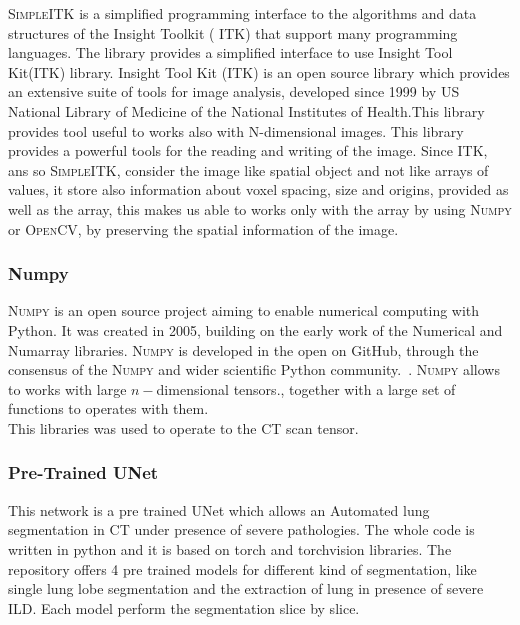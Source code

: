 \documentclass{standalone}
\begin{document}
	\textsc{SimpleITK} is a simplified programming interface to the algorithms and data structures of the Insight Toolkit ( \textsc{ITK}) that support many programming languages. The library provides a simplified interface to use Insight Tool Kit(ITK) library. 
	Insight Tool Kit (ITK) is an open source library which provides an extensive suite of tools for image analysis, developed since 1999 by US National Library of Medicine of the National Institutes of Health.This library provides tool useful to works also with N-dimensional images. 
	This library provides a powerful tools for the reading and writing of the image. Since \textsc{ITK}, ans so \textsc{SimpleITK},  consider the image like spatial object and not like arrays of values, it store also information about voxel spacing, size and origins, provided as well as the array, this makes us able to works only with the array by using \textsc{Numpy} or \textsc{OpenCV}, by preserving the spatial information of the image.
	
	\subsubsection*{Numpy}
	
	\textsc{Numpy} is an open source project aiming to enable numerical computing with Python. It was created in 2005, building on the early work of the Numerical and Numarray libraries.	\textsc{Numpy} is developed in the open on GitHub, through the consensus of the \textsc{Numpy} and wider scientific Python community.~\cite{Numpy}. \textsc{Numpy} allows to works with large $n-$dimensional tensors., together with a large set of functions to operates with them.\\
	This libraries was used to operate to the CT scan tensor. 

	\subsubsection*{Pre-Trained UNet} 
	
	This network is a pre trained UNet which allows an Automated lung segmentation in CT under presence of severe pathologies. The whole code is written in python and it is based on torch and torchvision libraries. The repository offers 4 pre trained models for different kind of segmentation, like single lung lobe segmentation and the extraction of lung in presence of severe ILD. Each model perform the segmentation slice by slice. 
	
\end{document}
